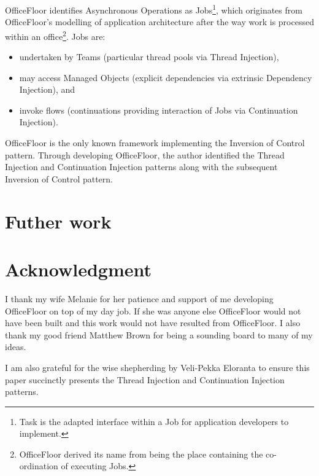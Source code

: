 \documentclass[prodmode]{style/acmlarge}
\begin{document}
OfficeFloor \cite{officefloor} identifies Asynchronous Operations as
Jobs\footnote{Task is the adapted interface within a Job for application
developers to implement.}, which originates from OfficeFloor's modelling of
application architecture after the way work is processed within an
office\footnote{OfficeFloor derived its name from being the place containing the
co-ordination of executing Jobs.}.  Jobs are:
\begin{itemize}
  \item undertaken by Teams (particular thread pools via Thread Injection),
  \item may access Managed Objects (explicit dependencies via extrinsic Dependency Injection), and
  \item invoke flows (continuations providing interaction of Jobs via Continuation Injection).
\end{itemize}

OfficeFloor is the only known framework implementing the Inversion of Control
pattern.  Through developing OfficeFloor, the author identified the Thread
Injection and Continuation Injection patterns along with the subsequent
Inversion of Control pattern.


\section{Futher work}




\section*{Acknowledgment} I thank my wife Melanie for her patience and support
of me developing OfficeFloor on top of my day job.  If she was anyone else
OfficeFloor would not have been built and this work would not have resulted from
OfficeFloor.  I also thank my good friend Matthew Brown for being a sounding
board to many of my ideas.

I am also grateful for the wise shepherding by Veli-Pekka Eloranta to ensure
this paper succinctly presents the Thread Injection and Continuation Injection
patterns.




\end{document}
